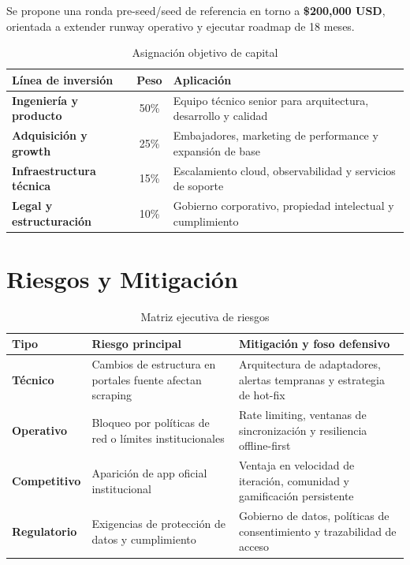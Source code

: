 \documentclass[10.5pt,a4paper]{article}
\newcommand{\tableheadrow}{\rowcolor{unsaMaroon}}
\newcommand{\tablehead}[1]{\color{white}\bfseries #1}
\begin{document}
Se propone una ronda pre-seed/seed de referencia en torno a \textbf{\$200,000 USD}, orientada a extender runway operativo y ejecutar roadmap de 18 meses.

\begin{table}[htbp]
\centering
\caption{Asignación objetivo de capital}
\begin{tabularx}{\textwidth}{>{\bfseries}p{4.2cm} c X}
\tableheadrow
  \tablehead{Línea de inversión} & \tablehead{Peso} & \tablehead{Aplicación} \\
\midrule
\rowcolor{white}
Ingeniería y producto   & 50\% &
  Equipo técnico senior para arquitectura, desarrollo y calidad \\
\rowcolor{unsaLight}
Adquisición y growth    & 25\% &
  Embajadores, marketing de performance y expansión de base \\
\rowcolor{white}
Infraestructura técnica & 15\% &
  Escalamiento cloud, observabilidad y servicios de soporte \\
\rowcolor{unsaLight}
Legal y estructuración  & 10\% &
  Gobierno corporativo, propiedad intelectual y cumplimiento \\
\bottomrule
\end{tabularx}
\end{table}


\section{Riesgos y Mitigación}

\begin{table}[htbp]
\centering
\caption{Matriz ejecutiva de riesgos}
\begin{tabularx}{\textwidth}{>{\bfseries}p{2.4cm} X X}
\tableheadrow
  \tablehead{Tipo} & \tablehead{Riesgo principal} & \tablehead{Mitigación y foso defensivo} \\
\midrule
\rowcolor{white}
Técnico &
  Cambios de estructura en portales fuente afectan scraping &
  Arquitectura de adaptadores, alertas tempranas y estrategia de hot-fix \\
\rowcolor{unsaLight}
Operativo &
  Bloqueo por políticas de red o límites institucionales &
  Rate limiting, ventanas de sincronización y resiliencia offline-first \\
\rowcolor{white}
Competitivo &
  Aparición de app oficial institucional &
  Ventaja en velocidad de iteración, comunidad y gamificación persistente \\
\rowcolor{unsaLight}
Regulatorio &
  Exigencias de protección de datos y cumplimiento &
  Gobierno de datos, políticas de consentimiento y trazabilidad de acceso \\
\bottomrule
\end{tabularx}
\end{table}
\end{document}
